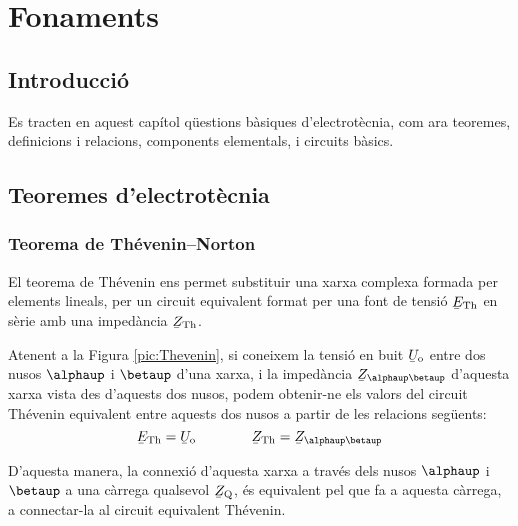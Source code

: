 \chapter{Fonaments}

\section{Introducció}
Es tracten en aquest capítol qüestions bàsiques
d'electrotècnia, com ara teoremes, definicions i relacions, components elementals, i circuits bàsics.


\section{Teoremes d'electrotècnia}\label{sec:teoremes}

\subsection{\texorpdfstring{Teorema de Thévenin--Norton}{Teorema de
            Thévenin-Norton}}\label{sec:T_N}

El teorema de Thévenin ens permet
substituir una xarxa complexa formada per elements lineals, per un
circuit equivalent format per una font de tensió $\cmplx{E}\ped{Th}$
en sèrie amb una impedància $\cmplx{Z}\ped{Th}$.


Atenent a la Figura \vref{pic:Thevenin}, si coneixem la tensió en
buit $\cmplx{U}\ped{o}$ entre dos nusos $\alphaup$ i $\betaup$ d'una
xarxa, i la impedància $\cmplx{Z}_{\alphaup\betaup}$ d'aquesta xarxa
vista des d'aquests dos nusos, podem obtenir-ne els valors del circuit
Thévenin equivalent entre aquests dos nusos a partir de les
relacions següents:
\begin{equation}
   \cmplx{E}\ped{Th} = \cmplx{U}\ped{o} \qquad\qquad  \cmplx{Z}\ped{Th} = \cmplx{Z}_{\alphaup\betaup}
\end{equation}

D'aquesta manera, la connexió d'aquesta xarxa a través dels nusos
$\alphaup$ i $\betaup$ a una càrrega qualsevol $\cmplx{Z}\ped{Q}$, és
equivalent pel que fa a aquesta càrrega, a connectar-la al circuit
equivalent Thévenin.
\begin{center}
    
    \label{pic:Thevenin}
\end{center}

